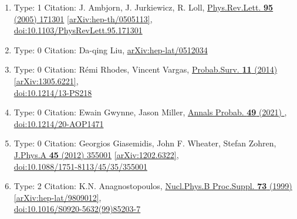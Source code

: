 \documentclass[a4paper,10pt]{article}
\begin{document}
\begin{enumerate}
\begin{enumerate}
  \item Type: 1 Citation: J. Ambjorn, J. Jurkiewicz, R. Loll, \href{https://www.doi.org/10.1103/PhysRevLett.95.171301}{Phys.Rev.Lett. {\bf 95} (2005) 171301}  \href{https://arxiv.org/abs/hep-th/0505113}{[arXiv:hep-th/0505113]},\\\href{https://www.doi.org/10.1103/PhysRevLett.95.171301}{doi:10.1103/PhysRevLett.95.171301}
  \item Type: 0 Citation: Da-qing Liu, \href{https://arxiv.org/abs/hep-lat/0512034}{arXiv:hep-lat/0512034}
  \item Type: 0 Citation: Rémi Rhodes, Vincent Vargas, \href{https://www.doi.org/10.1214/13-PS218}{Probab.Surv. {\bf 11} (2014) }  \href{https://arxiv.org/abs/1305.6221}{[arXiv:1305.6221]},\\\href{https://www.doi.org/10.1214/13-PS218}{doi:10.1214/13-PS218}
  \item Type: 0 Citation: Ewain Gwynne, Jason Miller, \href{https://www.doi.org/10.1214/20-AOP1471}{Annals Probab. {\bf 49} (2021) },\\\href{https://www.doi.org/10.1214/20-AOP1471}{doi:10.1214/20-AOP1471}
  \item Type: 0 Citation: Georgios Giasemidis, John F. Wheater, Stefan Zohren, \href{https://www.doi.org/10.1088/1751-8113/45/35/355001}{J.Phys.A {\bf 45} (2012) 355001}  \href{https://arxiv.org/abs/1202.6322}{[arXiv:1202.6322]},\\\href{https://www.doi.org/10.1088/1751-8113/45/35/355001}{doi:10.1088/1751-8113/45/35/355001}
  \item Type: 2 Citation: K.N. Anagnostopoulos, \href{https://www.doi.org/10.1016/S0920-5632(99)85203-7}{Nucl.Phys.B Proc.Suppl. {\bf 73} (1999) }  \href{https://arxiv.org/abs/hep-lat/9809012}{[arXiv:hep-lat/9809012]},\\\href{https://www.doi.org/10.1016/S0920-5632(99)85203-7}{doi:10.1016/S0920-5632(99)85203-7}

\end{enumerate}
\end{enumerate}
\end{document}
